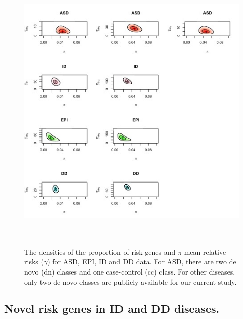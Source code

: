 \documentclass[]{article}
\begin{document}
\begin{figure}[H]
\includegraphics[width=\textwidth,height=14cm]{Picture/HeatMapPostDensityAUTandIDandEPIandDD.jpg}
\caption{The densities of the proportion of risk genes
  and $\pi$ mean relative risks ($\gamma$) for ASD, EPI, ID and DD data. For ASD, there
  are two de novo (dn) classes and one case-control (cc) class. For other
  diseases, only two de novo classes are publicly available for our
  current study.}
\label{fig:heatmapotherdiseases}
\end{figure}

\subsection{Novel risk genes in ID and DD diseases.}
\end{document}
